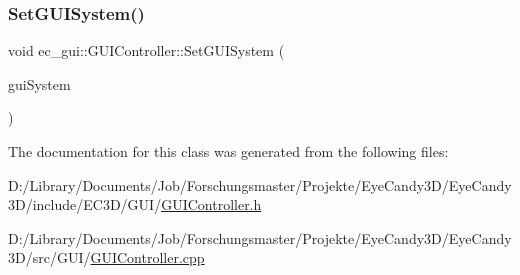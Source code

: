 \subsubsection{\texorpdfstring{Set\+G\+U\+I\+System()}{SetGUISystem()}}
{\footnotesize\ttfamily void ec\+\_\+gui\+::\+G\+U\+I\+Controller\+::\+Set\+G\+U\+I\+System (\begin{DoxyParamCaption}\item[{\mbox{\hyperlink{classec__gui_1_1_g_u_i_system}{G\+U\+I\+System}} $\ast$}]{gui\+System }\end{DoxyParamCaption})}



The documentation for this class was generated from the following files\+:\begin{DoxyCompactItemize}
\item 
D\+:/\+Library/\+Documents/\+Job/\+Forschungsmaster/\+Projekte/\+Eye\+Candy3\+D/\+Eye\+Candy3\+D/include/\+E\+C3\+D/\+G\+U\+I/\mbox{\hyperlink{_g_u_i_controller_8h}{G\+U\+I\+Controller.\+h}}\item 
D\+:/\+Library/\+Documents/\+Job/\+Forschungsmaster/\+Projekte/\+Eye\+Candy3\+D/\+Eye\+Candy3\+D/src/\+G\+U\+I/\mbox{\hyperlink{_g_u_i_controller_8cpp}{G\+U\+I\+Controller.\+cpp}}\end{DoxyCompactItemize}
